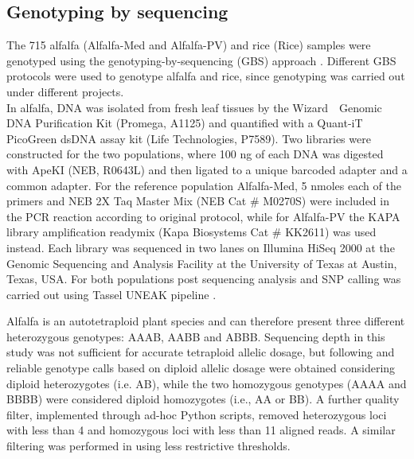 \subsection{Genotyping by sequencing}
\label{sec:overview}

The 715 alfalfa (Alfalfa-Med and Alfalfa-PV) and rice (Rice) samples were genotyped using the genotyping-by-sequencing (GBS) approach \cite{elshire_robust_2011}. Different GBS protocols were used to genotype alfalfa and rice, since genotyping was carried out under different projects.\\
In alfalfa, DNA was isolated from fresh leaf tissues by the Wizard~\textregistered~Genomic DNA Purification Kit (Promega, A1125) and quantified with a Quant-iT PicoGreen dsDNA assay kit (Life Technologies, P7589). Two libraries were constructed for the two populations, where 100 ng of each DNA was digested with ApeKI (NEB, R0643L) and then ligated to a unique barcoded adapter and a common adapter. For the reference population Alfalfa-Med, 5 nmoles each of the primers and NEB 2X Taq Master Mix (NEB Cat \# M0270S) were included in the PCR reaction according to \cite{elshire_robust_2011} original protocol, while for Alfalfa-PV the KAPA library amplification readymix (Kapa Biosystems Cat \# KK2611) was used instead. Each library was sequenced in two lanes on Illumina HiSeq 2000 at the Genomic Sequencing and Analysis Facility at the University of Texas at Austin, Texas, USA. For both populations post sequencing analysis and SNP calling was carried out using Tassel UNEAK pipeline \cite{lu_switchgrass_2013}.

Alfalfa is an autotetraploid plant species and can therefore present three different heterozygous genotypes: AAAB, AABB and ABBB. Sequencing depth in this study was not sufficient for accurate tetraploid allelic dosage, but following \cite{li_saturated_2014} and \cite{li_genomic_2015} reliable genotype calls based on diploid allelic dosage were obtained considering diploid heterozygotes (i.e. AB), while the two homozygous genotypes (AAAA and BBBB) were considered diploid homozygotes (i.e., AA or BB). A further quality filter, implemented through ad-hoc Python scripts, removed heterozygous loci with less than 4 and homozygous loci with less than 11 aligned reads. A similar filtering was performed in \cite{Rocher_validation_2015} using less restrictive thresholds. 

